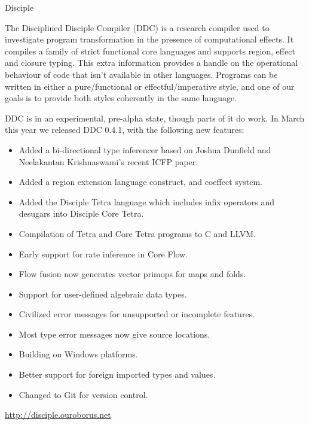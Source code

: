 \begin{hcarentry}[section]{Disciple}
\makeheader

The Disciplined Disciple Compiler (DDC) is a research compiler used to investigate program transformation in the presence of computational effects. It compiles a family of strict functional core languages and supports region, effect and closure typing. This extra information provides a handle on the operational behaviour of code that isn't available in other languages. Programs can be written in either a pure/functional or effectful/imperative style, and one of our goals is to provide both styles coherently in the same language.

\WhatsNew

DDC is in an experimental, pre-alpha state, though parts of it do work. In March this year we released DDC 0.4.1, with the following new features:

\begin{itemize}
\item Added a bi-directional type inferencer based on Joshua Dunﬁeld and Neelakantan Krishnaswami's recent ICFP paper.
\item Added a region extension language construct, and coeffect system.
\item Added the Disciple Tetra language which includes infix operators and desugars into Disciple Core Tetra.
\item Compilation of Tetra and Core Tetra programs to C and LLVM.
\item Early support for rate inference in Core Flow.
\item Flow fusion now generates vector primops for maps and folds.
\item Support for user-defined algebraic data types.
\item Civilized error messages for unsupported or incomplete features.
\item Most type error messages now give source locations.
\item Building on Windows platforms.
\item Better support for foreign imported types and values.
\item Changed to Git for version control.
\end{itemize}

\FurtherReading
  \url{http://disciple.ouroborus.net}
\end{hcarentry}

